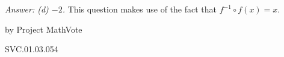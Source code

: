 
{\it Answer:  (d) $-2$.}  This question makes use of the fact that $f^{-1}\circ f(x)=x$.

\medskip
by Project MathVote

SVC.01.03.054

